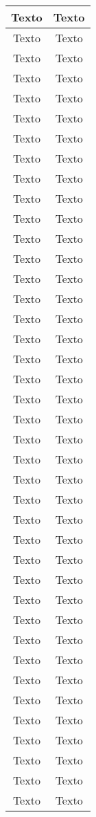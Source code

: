 	\begin{longtable}[r]{|c|c|}		
		\hline
		Texto & Texto\\
		\hline
		Texto & Texto\\
		\hline
		Texto & Texto\\
		\hline
		Texto & Texto\\
		\hline
		Texto & Texto\\
		\hline
		Texto & Texto\\
		\hline
		Texto & Texto\\
		\hline
		Texto & Texto\\
		\hline
		Texto & Texto\\
		\hline
		Texto & Texto\\
		\hline
		Texto & Texto\\
		\hline
		Texto & Texto\\
		\hline
		Texto & Texto\\
		\hline
		Texto & Texto\\
		\hline
		Texto & Texto\\
		\hline
		Texto & Texto\\
		\hline
		Texto & Texto\\
		\hline
		Texto & Texto\\
		\hline
		Texto & Texto\\
		\hline
		Texto & Texto\\
		\hline
		Texto & Texto\\
		\hline
		Texto & Texto\\
		\hline
		Texto & Texto\\
		\hline
		Texto & Texto\\
		\hline
		Texto & Texto\\
		\hline
		Texto & Texto\\
		\hline
		Texto & Texto\\
		\hline
		Texto & Texto\\
		\hline
		Texto & Texto\\
		\hline
		Texto & Texto\\
		\hline
		Texto & Texto\\
		\hline
		Texto & Texto\\
		\hline
		Texto & Texto\\
		\hline
		Texto & Texto\\
		\hline
		Texto & Texto\\
		\hline
		Texto & Texto\\
		\hline
		Texto & Texto\\
		\hline
		Texto & Texto\\
		\hline
		Texto & Texto\\
		\hline
		Texto & Texto\\
		\hline
	\end{longtable}
	
